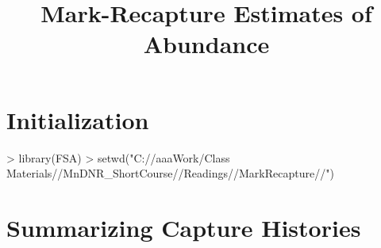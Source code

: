 \documentclass[a4paper]{article}
\begin{document}
\title{Mark-Recapture Estimates of Abundance}
\date{}  %
\maketitle
\vspace{-72pt}


\section{Initialization}
\begin{Schunk}
\begin{Sinput}
> library(FSA)
> setwd("C://aaaWork/Class Materials//MnDNR_ShortCourse//Readings//MarkRecapture//")
\end{Sinput}
\end{Schunk}

\section{Summarizing Capture Histories}
\end{document}
